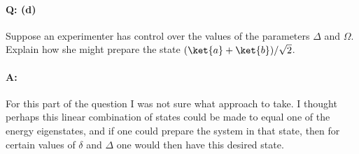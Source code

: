 {\paragraph{Q: (d)}

Suppose an experimenter has control over the values of the parameters \(\Delta\) and \(\Omega\).  Explain how she might prepare the state \((\ket{a} + \ket{b})/\sqrt{2}\).

\paragraph{A:}

For this part of the question I was not sure what approach to take.  I thought perhaps this linear combination of states could be made to equal one of the energy eigenstates, and if one could prepare the system in that state, then for certain values of \(\delta\) and \(\Delta\) one would then have this desired state.

}
